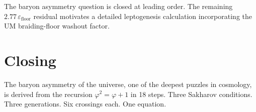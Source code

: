 \documentclass[12pt]{article}
\begin{document}
The baryon asymmetry question is closed at leading order. The remaining
$2.77\,\varepsilon_{\text{floor}}$ residual motivates a detailed
leptogenesis calculation incorporating the UM braiding-floor washout
factor.

\section*{Closing}

The baryon asymmetry of the universe, one of the deepest puzzles in
cosmology, is derived from the recursion $\varphi^2 = \varphi + 1$ in 18 steps.
Three Sakharov conditions. Three generations. Six crossings each. One
equation.
\end{document}
